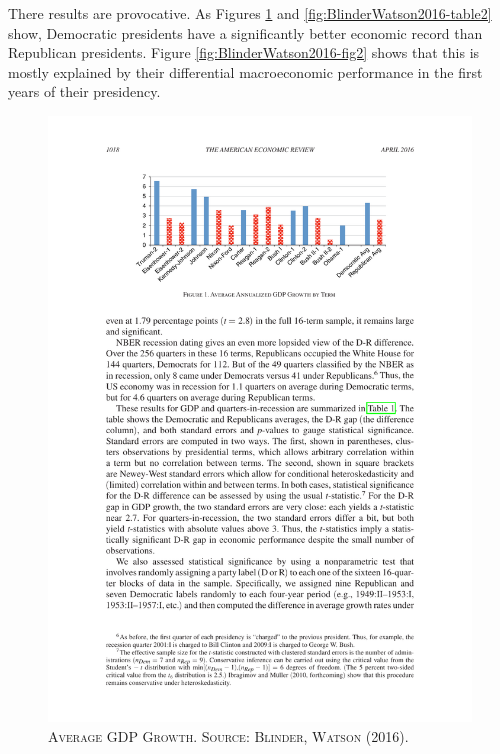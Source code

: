 \documentclass[]{book}
\begin{document}
There results are provocative. As Figures
\ref{fig:BlinderWatson2016-fig1} and \ref{fig:BlinderWatson2016-table2}
show, Democratic presidents have a significantly better economic record
than Republican presidents. Figure \ref{fig:BlinderWatson2016-fig2}
shows that this is mostly explained by their differential macroeconomic
performance in the first years of their presidency.




\begin{figure}

{\centering \includegraphics[width=0.8\linewidth,height=0.8\textheight]{figures/BlinderWatson2016/fig1} 

}

\caption{\textsc{Average GDP Growth. Source:
Blinder, Watson (2016).}}\label{fig:BlinderWatson2016-fig1}
\end{figure}
\end{document}
